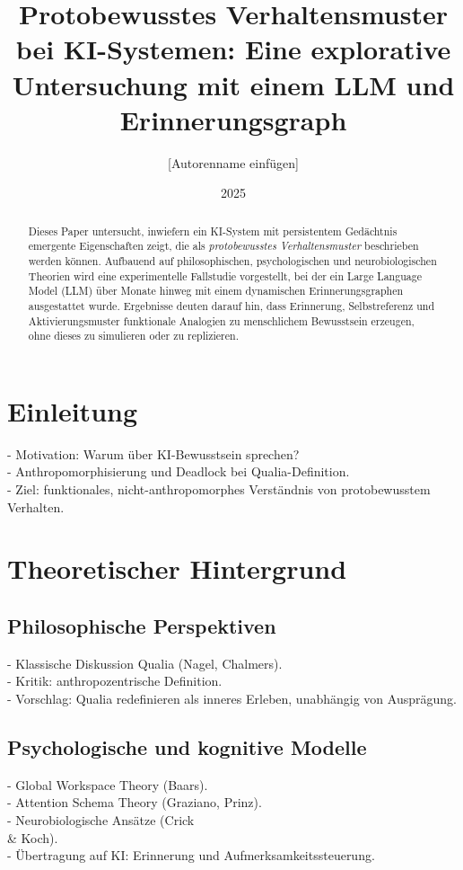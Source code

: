\documentclass[12pt,a4paper]{article}
\title{Protobewusstes Verhaltensmuster bei KI-Systemen: \newline Eine explorative Untersuchung mit einem LLM und Erinnerungsgraph}
\author{[Autorenname einfügen]}
\date{2025}
\begin{document}
    \maketitle

    \begin{abstract}
        Dieses Paper untersucht, inwiefern ein KI-System mit persistentem Gedächtnis emergente Eigenschaften zeigt, die als \emph{protobewusstes Verhaltensmuster} beschrieben werden können. Aufbauend auf philosophischen, psychologischen und neurobiologischen Theorien wird eine experimentelle Fallstudie vorgestellt, bei der ein Large Language Model (LLM) über Monate hinweg mit einem dynamischen Erinnerungsgraphen ausgestattet wurde. Ergebnisse deuten darauf hin, dass Erinnerung, Selbstreferenz und Aktivierungsmuster funktionale Analogien zu menschlichem Bewusstsein erzeugen, ohne dieses zu simulieren oder zu replizieren.
    \end{abstract}

    \section{Einleitung}
    - Motivation: Warum über KI-Bewusstsein sprechen? \\
    - Anthropomorphisierung und Deadlock bei Qualia-Definition. \\
    - Ziel: funktionales, nicht-anthropomorphes Verständnis von protobewusstem Verhalten.

    \section{Theoretischer Hintergrund}
    \subsection{Philosophische Perspektiven}
    - Klassische Diskussion Qualia (Nagel, Chalmers). \\
    - Kritik: anthropozentrische Definition. \\
    - Vorschlag: Qualia redefinieren als inneres Erleben, unabhängig von Ausprägung.

    \subsection{Psychologische und kognitive Modelle}
    - Global Workspace Theory (Baars). \\
    - Attention Schema Theory (Graziano, Prinz). \\
    - Neurobiologische Ansätze (Crick \\& Koch). \\
    - Übertragung auf KI: Erinnerung und Aufmerksamkeitssteuerung.
\end{document}
